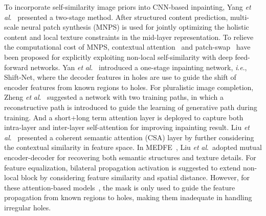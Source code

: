 \documentclass[10pt,journal,compsoc]{IEEEtran}
\newcommand{\ie}{\textit{i}.\textit{e}.}
\newcommand{\etal}{\textit{et} \textit{al}.}
\begin{document}
To incorporate self-similarity image priors into CNN-based inpainting, Yang \etal~\cite{Yang_2017_CVPR} presented a two-stage method.
%
After structured content prediction, multi-scale neural patch synthesis (MNPS) is used for jointly optimizing the holistic content and local texture constraints in the mid-layer representation.
%
To relieve the computational cost of MNPS, contextual attention~\cite{yu2018generative} and patch-swap~\cite{song_contextual_2018} have been proposed for explicitly exploiting non-local self-similarity with deep feed-forward networks.
%
Yan \etal~\cite{Yan_2018_Shift} introduced a one-stage inpainting network, \ie, Shift-Net, where the decoder features in holes are use to guide the shift of encoder features from known regions to holes.
%
For pluralistic image completion, Zheng \etal~\cite{Zheng2019Pluralistic} suggested a network with two training paths, in which a reconstructive path is introduced to guide the learning of generative path during training.
%
And a short+long term attention layer is deployed to capture both intra-layer and inter-layer self-attention for improving inpainting result.
%
Liu \etal~\cite{liu2019coherent} presented a coherent semantic attention (CSA) layer by further considering the contextual similarity in feature space.
%
{In MEDFE~\cite{liu2020rethinking}, Liu \etal~adopted mutual encoder-decoder for recovering both semantic structures and texture details.
%
For feature equalization, bilateral propagation activation is suggested to extend non-local block by considering feature similarity and spatial distance.
%
}
%
However, for these attention-based models~\cite{yu2018generative,song_contextual_2018,Yan_2018_Shift,Zheng2019Pluralistic,liu2019coherent,liu2020rethinking}, the mask is only used to guide the feature propagation from known regions to holes, making them inadequate in handling irregular holes.





%
\end{document}

